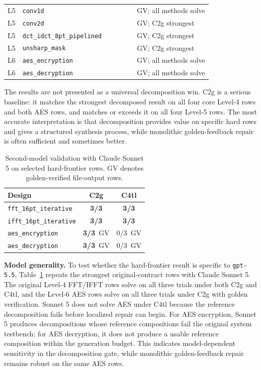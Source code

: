 \documentclass[sigconf,anonymous]{acmart}
\newcommand{\cTwoG}{C2g\xspace}
\newcommand{\cFourTL}{C4tl\xspace}
\newcommand{\yes}{\textbf{3/3}}
\newcommand{\no}{0/3}
\newcommand{\hmcell}[2]{\begingroup\setlength{\fboxsep}{1pt}\colorbox{#1}{\makebox[0.78cm][c]{\strut #2}}\endgroup}
\newcommand{\hmyes}{\hmcell{hmsolve}{\textbf{3/3}}}
\newcommand{\hmno}{\hmcell{hmfail}{0/3}}
\newcommand{\hmpart}[1]{\hmcell{hmpartial}{#1}}
\begin{document}
\begin{table}[t]
\begin{tabular}{llccccp{2.7cm}}
\midrule
L5 & \texttt{conv1d} & \hmyes & \hmyes & \hmyes & \hmyes & GV; all methods solve \\
L5 & \texttt{conv2d} & \hmno & \hmyes & \hmno & \hmno & GV; \cTwoG strongest \\
L5 & \texttt{dct\_idct\_8pt\_pipelined} & \hmno & \hmyes & \hmno & \hmno & GV; \cTwoG strongest \\
L5 & \texttt{unsharp\_mask} & \hmno & \hmyes & \hmno & \hmpart{1/3} & GV; \cTwoG strongest \\
\midrule
L6 & \texttt{aes\_encryption} & \hmyes & \hmyes & \hmyes & \hmyes & GV; all methods solve \\
L6 & \texttt{aes\_decryption} & \hmyes & \hmyes & \hmyes & \hmyes & GV; all methods solve \\
\bottomrule
\end{tabular}
\end{table}

The results are not presented as a universal decomposition win.
\cTwoG is a serious baseline: it matches the strongest decomposed result on all four core Level-4 rows and both AES rows, and matches or exceeds it on all four Level-5 rows.
The most accurate interpretation is that decomposition provides value on specific hard rows and gives a structured synthesis process, while monolithic golden-feedback repair is often sufficient and sometimes better.

\begin{table}[t]
\centering
\caption{Second-model validation with Claude Sonnet 5 on selected hard-frontier rows. GV denotes golden-verified file-output rows.}
\label{tab:sonnet}
\scriptsize
\setlength{\tabcolsep}{4pt}
\begin{tabular}{lcc}
\toprule
Design & \cTwoG & \cFourTL \\
\midrule
\texttt{fft\_16pt\_iterative} & \yes & \yes \\
\texttt{ifft\_16pt\_iterative} & \yes & \yes \\
\texttt{aes\_encryption} & \yes\ GV & \no\ GV \\
\texttt{aes\_decryption} & \yes\ GV & \no\ GV \\
\bottomrule
\end{tabular}
\vspace{-0.35\baselineskip}
\end{table}

\textbf{Model generality.}
To test whether the hard-frontier result is specific to \texttt{gpt-5.5}, Table~\ref{tab:sonnet} repeats the strongest original-contract rows with Claude Sonnet 5.
The original Level-4 FFT/IFFT rows solve on all three trials under both \cTwoG and \cFourTL, and the Level-6 AES rows solve on all three trials under \cTwoG with golden verification.
Sonnet 5 does not solve AES under \cFourTL because the reference decomposition fails before localized repair can begin.
For AES encryption, Sonnet 5 produces decompositions whose reference compositions fail the original system testbench; for AES decryption, it does not produce a usable reference composition within the generation budget.
This indicates model-dependent sensitivity in the decomposition gate, while monolithic golden-feedback repair remains robust on the same AES rows.
\end{document}
